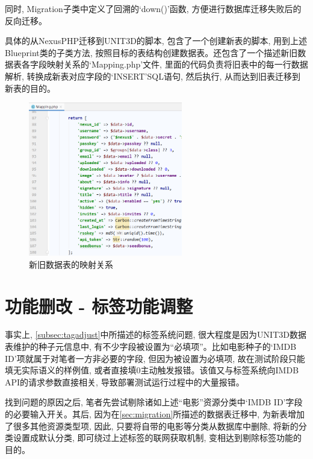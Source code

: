同时, Migration子类中定义了回溯的`down()'函数, 方便进行数据库迁移失败后的反向迁移。

具体的从NexusPHP迁移到UNIT3D的脚本, 包含了一个创建新表的脚本, 用到上述Blueprint类的子类方法, 按照目标的表结构创建数据表。还包含了一个描述新旧数据表各字段映射关系的`Mapping.php'文件, 里面的代码负责将旧表中的每一行数据解析, 转换成新表对应字段的`INSERT'SQL语句, 然后执行, 从而达到旧表迁移到新表的目的。

\begin{figure}[ht]
    \centering
    \includegraphics[width=0.6\textwidth]{support-files/4.3-tjupt-to-unit3d-script-mapping.png}
    \caption{新旧数据表的映射关系}
    \label{fig:mapnexusphpunit3d}
\end{figure}



\section{功能删改 - 标签功能调整}

事实上, \ref{subsec:tagadjust}中所描述的标签系统问题, 很大程度是因为UNIT3D数据表维护的种子元信息中, 有不少字段被设置为``必填项''。比如电影种子的`IMDB ID'项就属于对笔者一方非必要的字段, 但因为被设置为必填项, 故在测试阶段只能填无实际语义的样例值, 或者直接填0主动触发报错。该值又与标签系统向IMDB API的请求参数直接相关, 导致部署测试运行过程中的大量报错。

找到问题的原因之后, 笔者先尝试剔除诸如上述``电影''资源分类中`IMDB ID'字段的必要输入开关。其后, 因为在\ref{sec:migration}所描述的数据表迁移中, 为新表增加了很多其他资源类型项, 因此, 只要将自带的电影等分类从数据库中删除, 将新的分类设置成默认分类, 即可绕过上述标签的联网获取机制, 变相达到剔除标签功能的目的。

